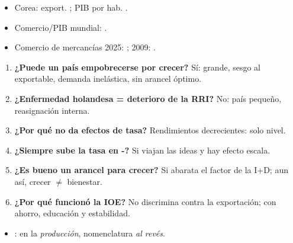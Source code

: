 \documentclass{article}
\begin{document}
\begin{columnas}
\anexorepaso
{}
\begin{itemize}
\item Corea: export. ; PIB por hab. .
\item Comercio/PIB mundial: .
\item Comercio de mercancías 2025: ; 2009: .
\end{itemize}
\begin{enumerate}
\item \textbf{¿Puede un país empobrecerse por crecer?} Sí: grande, sesgo al exportable, demanda inelástica, sin arancel óptimo.
\item \textbf{¿Enfermedad holandesa = deterioro de la RRI?} No: país pequeño, reasignación interna.
\item \textbf{¿Por qué  no da efectos de tasa?} Rendimientos decrecientes: solo nivel.
\item \textbf{¿Siempre sube la tasa en -?} Si viajan las ideas y hay efecto escala.
\item \textbf{¿Es bueno un arancel para crecer?} Si abarata el factor de la I+D; aun así, crecer $\neq$ bienestar.
\item \textbf{¿Por qué funcionó la IOE?} No discrimina contra la exportación; con ahorro, educación y estabilidad.
\end{enumerate}
\begin{trampa}
\begin{itemize}
\item {}: en la \emph{producción}, nomenclatura \emph{al revés}.

\end{itemize}
\end{trampa}
\end{columnas}
\end{document}
